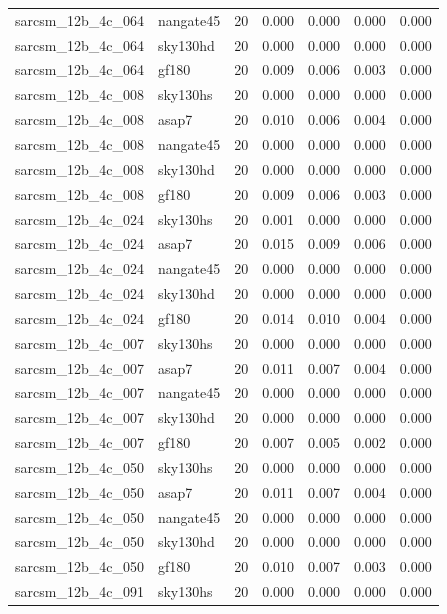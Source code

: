 \begin{tabular}{llrrrrr}
sarcsm\_12b\_4c\_064 & nangate45 & 20 & 0.000 & 0.000 & 0.000 & 0.000 \\
sarcsm\_12b\_4c\_064 & sky130hd & 20 & 0.000 & 0.000 & 0.000 & 0.000 \\
sarcsm\_12b\_4c\_064 & gf180 & 20 & 0.009 & 0.006 & 0.003 & 0.000 \\
sarcsm\_12b\_4c\_008 & sky130hs & 20 & 0.000 & 0.000 & 0.000 & 0.000 \\
sarcsm\_12b\_4c\_008 & asap7 & 20 & 0.010 & 0.006 & 0.004 & 0.000 \\
sarcsm\_12b\_4c\_008 & nangate45 & 20 & 0.000 & 0.000 & 0.000 & 0.000 \\
sarcsm\_12b\_4c\_008 & sky130hd & 20 & 0.000 & 0.000 & 0.000 & 0.000 \\
sarcsm\_12b\_4c\_008 & gf180 & 20 & 0.009 & 0.006 & 0.003 & 0.000 \\
sarcsm\_12b\_4c\_024 & sky130hs & 20 & 0.001 & 0.000 & 0.000 & 0.000 \\
sarcsm\_12b\_4c\_024 & asap7 & 20 & 0.015 & 0.009 & 0.006 & 0.000 \\
sarcsm\_12b\_4c\_024 & nangate45 & 20 & 0.000 & 0.000 & 0.000 & 0.000 \\
sarcsm\_12b\_4c\_024 & sky130hd & 20 & 0.000 & 0.000 & 0.000 & 0.000 \\
sarcsm\_12b\_4c\_024 & gf180 & 20 & 0.014 & 0.010 & 0.004 & 0.000 \\
sarcsm\_12b\_4c\_007 & sky130hs & 20 & 0.000 & 0.000 & 0.000 & 0.000 \\
sarcsm\_12b\_4c\_007 & asap7 & 20 & 0.011 & 0.007 & 0.004 & 0.000 \\
sarcsm\_12b\_4c\_007 & nangate45 & 20 & 0.000 & 0.000 & 0.000 & 0.000 \\
sarcsm\_12b\_4c\_007 & sky130hd & 20 & 0.000 & 0.000 & 0.000 & 0.000 \\
sarcsm\_12b\_4c\_007 & gf180 & 20 & 0.007 & 0.005 & 0.002 & 0.000 \\
sarcsm\_12b\_4c\_050 & sky130hs & 20 & 0.000 & 0.000 & 0.000 & 0.000 \\
sarcsm\_12b\_4c\_050 & asap7 & 20 & 0.011 & 0.007 & 0.004 & 0.000 \\
sarcsm\_12b\_4c\_050 & nangate45 & 20 & 0.000 & 0.000 & 0.000 & 0.000 \\
sarcsm\_12b\_4c\_050 & sky130hd & 20 & 0.000 & 0.000 & 0.000 & 0.000 \\
sarcsm\_12b\_4c\_050 & gf180 & 20 & 0.010 & 0.007 & 0.003 & 0.000 \\
sarcsm\_12b\_4c\_091 & sky130hs & 20 & 0.000 & 0.000 & 0.000 & 0.000 \\

\end{tabular}
